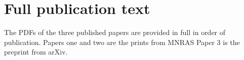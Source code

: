 
\chapter{Full publication text}
\label{Appx:Papers}

The PDFs of the three published papers are provided in full in order of publication. Papers one \cite{Grylls2019AClusters} and two \cite{Grylls2020PredictingSTEEL} are the prints from MNRAS Paper 3 \cite{Grylls2020TheFractions} is the preprint from arXiv.




